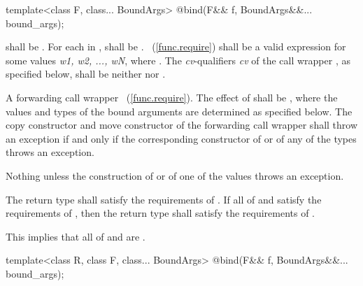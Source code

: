 %
\begin{itemdecl}
template<class F, class... BoundArgs>
  @\unspec@ bind(F&& f, BoundArgs&&... bound_args);
\end{itemdecl}

\begin{itemdescr}
\pnum
\requires
{} shall be . For each 
in ,  shall be .
~(\ref{func.require}) shall be a valid expression for some
values \textit{w1, w2, ..., wN}, where
.
The \textit{cv}-qualifiers \textit{cv} of the call wrapper ,
as specified below, shall be neither  nor .

\pnum\returns
A forwarding call wrapper ~(\ref{func.require}).
The effect of  shall
be ,
where the values and types of the bound
arguments  are determined as specified below.
The copy constructor and move constructor of the forwarding call wrapper shall throw an
exception if and only if the corresponding constructor of  or of any of the types
 throws an exception.

\pnum
\throws Nothing unless the construction of
 or of one of the values  throws an exception.

\pnum
\remarks The return type shall satisfy the requirements of . If all
of  and  satisfy the requirements of , then the
return type shall satisfy the requirements of . \begin{note} This implies
that all of  and  are . \end{note}
\end{itemdescr}

%
\begin{itemdecl}
template<class R, class F, class... BoundArgs>
  @\unspec@ bind(F&& f, BoundArgs&&... bound_args);
\end{itemdecl}

